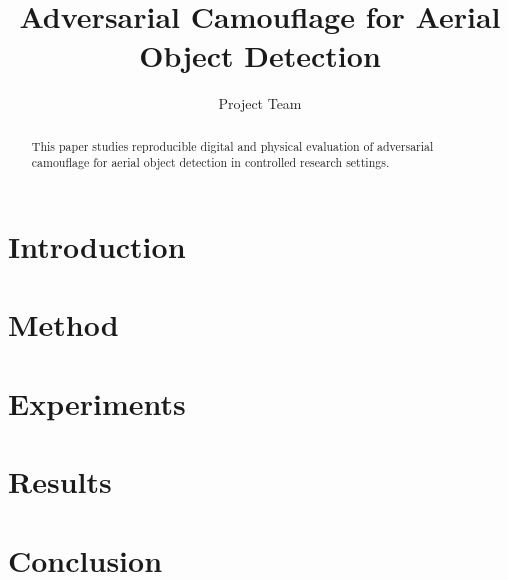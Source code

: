 \documentclass[conference]{IEEEtran}
\title{Adversarial Camouflage for Aerial Object Detection}
\author{Project Team}
\begin{document}
\maketitle

\begin{abstract}
This paper studies reproducible digital and physical evaluation of adversarial camouflage for aerial object detection in controlled research settings.
\end{abstract}

\section{Introduction}

\section{Method}

\section{Experiments}

\section{Results}

\section{Conclusion}



\end{document}
